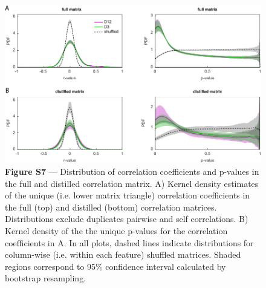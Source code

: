 \documentclass[12pt,letterpaper]{article}
\begin{document}
\begin{figure}[t!]
    \includegraphics[width=\textwidth]{../figures/chapter_3/fig_s7.pdf}
    \vspace{.05in}
    \caption*{\textbf{Figure S7} — Distribution of correlation coefficients and p-values in the full and distilled correlation matrix. A) Kernel density estimates of the unique (i.e. lower matrix triangle) correlation coefficients in the full (top) and distilled (bottom) correlation matrices. Distributions exclude duplicates pairwise and self correlations. B) Kernel density of the the unique p-values for the correlation coefficients in A. In all plots, dashed lines indicate distributions for column-wise (i.e. within each feature) shuffled matrices. Shaded regions correspond to 95\% confidence interval calculated by bootstrap resampling.}
\end{figure}
\clearpage
\end{document}
